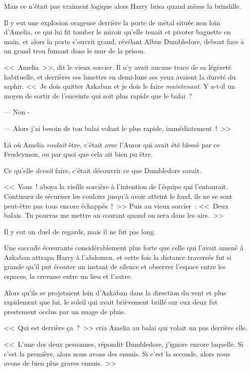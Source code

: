 Mais ce n'était pas vraiment logique alors Harry brisa quand même la brindille.

\later

Il y eut une explosion orageuse derrière la porte de métal située non loin d'Amelia, ce qui lui fit tomber le miroir qu'elle tenait et pivoter baguette en main, et alors la porte s'ouvrit grand, révélant Albus Dumbledore, debout face à un grand trou fumant dans le mur de la prison.

<<~Amelia~>>, dit le vieux sorcier. Il n'y avait aucune trace de sa légèreté habituelle, et derrières ses lunettes en demi-lune ses yeux avaient la dureté du saphir. <<~Je dois quitter Azkaban et je dois le faire \emph{maintenant}. Y a-t-il un moyen de sortir de l'enceinte qui soit plus rapide que le balai~?

--- Non -

--- Alors j'ai besoin de ton balai volant le plus rapide, immédiatement~!~>>

Là où Amelia \emph{voulait} être, c'était avec l'Auror qui avait été blessé par ce Feudeymon, ou par quoi que cela ait bien pu être.

Ce qu'elle \emph{devait} faire, c'était découvrir ce que Dumbledore savait.

<<~Vous~! aboya la vieille sorcière à l'intention de l'équipe qui l'entourait. Continuez de sécuriser les couloirs jusqu'à avoir atteint le fond, ils ne se sont peut-être pas tous encore échappés~!~>> Puis au vieux sorcier~: <<~Deux balais. Tu pourras me mettre au courant quand on sera dans les airs.~>>

Il y eut un duel de regards, mais il ne fut pas long.

\later

Une saccade écœurante considérablement plus forte que celle qui l'avait amené à Azkaban attrapa Harry à l'abdomen, et cette fois la distance traversée fut si grande qu'il put écouter un instant de silence et observer l'espace entre les espaces, la crevasse entre un lieu et l'autre.

\later

Alors qu'ils se projetaient loin d'Azkaban dans la direction du vent et plus rapidement que lui, le soleil qui avait brièvement brillé sur eux deux fut prestement occlus par un nuage de pluie.

<<~Qui est derrière ça~?~>> cria Amelia au balai qui volait un pas derrière elle.

<<~L'une des deux personnes, répondit Dumbledore, j'ignore encore laquelle. Si c'est la première, alors nous avons des ennuis. Si c'est la seconde, alors nous avons de bien plus graves ennuis.~>>

